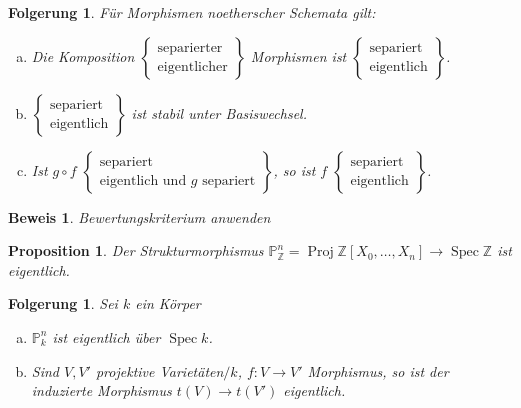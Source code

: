 \documentclass[paper = A4, fontsize=12pt, numbers=noendperiod, chapterprefix=true]{scrbook}
\theoremstyle{break}
\newtheorem{Prop}[Def]{Proposition}
\newtheorem{Folg}[Def]{Folgerung}
\theoremstyle{nonumberbreak}
\newtheorem{bew}{Beweis}
\theoremstyle{nonumberplain}
\DeclareMathOperator{\Proj}{Proj}
\DeclareMathOperator{\Spec}{Spec}
\newcommand{\IP}{\mathbb{P}}%
\newcommand{\Z}{\mathbb{Z}}
\begin{document}
\begin{Folg}\label{8.9}
F\"ur Morphismen noetherscher Schemata gilt:
\begin{enumerate}[a)]
\item\label{8.9a}
	Die Komposition $\left\{\begin{array}{c}\text{separierter}\\ \text{eigentlicher}\end{array}\right\}$ Morphismen ist $\left\{\begin{array}{c}\text{separiert}\\ \text{eigentlich}\end{array}\right\}$.
\item\label{8.9c}
	$\left\{\begin{array}{c}\text{separiert}\\ \text{eigentlich}\end{array}\right\}$ ist stabil unter Basiswechsel.
\item\label{8.9c}
	Ist $g \circ f$ $\left\{\begin{array}{c}\text{separiert}\\ \text{eigentlich und } g \text{ separiert}\end{array}\right\}$, so ist $f$ $\left\{\begin{array}{c}\text{separiert}\\ \text{eigentlich}\end{array}\right\}$.
\end{enumerate}\end{Folg}

\begin{bew}
Bewertungskriterium anwenden
\end{bew}

\begin{Prop}\label{8.10}
Der Strukturmorphismus $\IP_\Z^n = \Proj \Z[X_0,\ldots ,X_n] \to \Spec \Z$ ist eigentlich.
\end{Prop}

\begin{Folg}
Sei $k$ ein K\"orper
\begin{enumerate}[a)]
\item
	$\IP_k^n$ ist eigentlich \"uber $\Spec k$.
\item
	Sind $V, V'$ projektive Variet\"aten$/k$, $f: V \to V'$ Morphismus, so ist der induzierte Morphismus $t(V) \to t(V')$ eigentlich.
\end{enumerate}\end{Folg}
\end{document}
